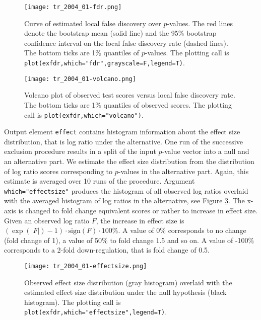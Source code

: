\documentclass[11pt,a4paper,fleqn]{report}
\newcommand{\Robject}[1]{{\texttt{#1}}}
\newcommand{\Rfunarg}[1]{{\texttt{#1}}}
\begin{document}
\begin{figure}[tp]
\centering
\texttt{[image: tr\_2004\_01-fdr.png]}
\caption{Curve of estimated local false discovery over $p$-values. The red lines denote the bootstrap mean (solid line) and the 95\% bootstrap confidence interval on the local false discovery rate (dashed lines). The bottom ticks are 1\% quantiles of $p$-values. The plotting call is  \texttt{plot(exfdr,which="fdr",grayscale=F,legend=T)}.}\label{fig_fdr}
\end{figure}

\begin{figure}[tp]
\centering
\texttt{[image: tr\_2004\_01-volcano.png]}
\caption{Volcano plot of observed test scores versus local false discovery rate. The bottom ticks are 1\% quantiles of observed scores. The plotting call is \texttt{plot(exfdr,which="volcano")}.}\label{fig_volcano}
\end{figure}

Output element \Robject{effect} contains histogram information about the effect size distribution, that is log ratio under the alternative. One run of the successive exclusion procedure results in a split of the input $p$-value vector into a null and an alternative part. We estimate the effect size distribution from the distribution of log ratio scores corresponding to $p$-values in the alternative part. Again, this estimate is averaged over 10 runs of the procedure. Argument \Rfunarg{which="effectsize"} produces the histogram of all observed log ratios overlaid with the averaged histogram of log ratios in the alternative, see Figure \ref{fig_effectsize}. The x-axis is changed to fold change equivalent scores or rather to increase in effect size. Given an observed log ratio $F$, the increase in effect size is $(\exp (|F|)-1) \cdot \mbox{sign} (F) \cdot 100\%$. A value of 0\% corresponds to no change (fold change of 1), a value of 50\% to fold change 1.5 and so on. A value of -100\% corresponds to a 2-fold down-regulation, that is fold change of 0.5.

\begin{figure}[tp]
\centering
\texttt{[image: tr\_2004\_01-effectsize.png]}
\caption{Observed effect size distribution (gray histogram) overlaid with the estimated effect size distribution under the null hypothesis (black histogram). The plotting call is \texttt{plot(exfdr,which="effectsize",legend=T)}.}\label{fig_effectsize}
\end{figure}
\end{document}
